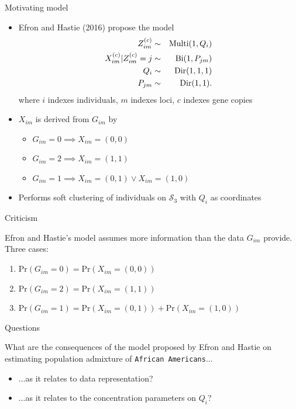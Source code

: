 \documentclass{beamer}
\begin{document}
\begin{frame}{Motivating model}
\begin{itemize}
    \item Efron and Hastie (2016) propose the model
    \begin{eqnarray}
        Z_{im}^{(c)} &\sim& \text{Multi}(1, Q_i)\\
        X_{im}^{(c)} | Z_{im}^{(c)} = j &\sim& \text{Bi}(1, P_{jm}) \notag\\
        Q_i &\sim& \text{Dir}(1, 1, 1) \notag\\
        P_{jm} &\sim& \text{Dir}(1,1). \notag
    \end{eqnarray}
    where $i$ indexes individuals, $m$ indexes loci, $c$ indexes gene copies
    \item $X_{im}$ is derived from $G_{im}$ by
    \begin{itemize}
        \item $G_{im} = 0 \implies X_{im} = (0, 0)$
        \item $G_{im} = 2 \implies X_{im} = (1,1)$
        \item $G_{im} = 1 \implies X_{im} = (0, 1) \lor X_{im} = (1, 0)$
    \end{itemize}
    \item Performs soft clustering of individuals on $\mathcal{S}_3$ with $Q_i$ as coordinates
\end{itemize}
\end{frame}

\begin{frame}{Criticism}

Efron and Hastie's model assumes more information than the data $G_{im}$ provide. Three cases:
\begin{enumerate}
    \item $\text{Pr}(G_{im} = 0) = \text{Pr}(X_{im} = (0, 0))$
    \item $\text{Pr}(G_{im} = 2) = \text{Pr}(X_{im} = (1, 1))$
    \item \color{red}$\text{Pr}(G_{im} = 1) = \text{Pr}(X_{im} = (0, 1)) + \text{Pr}(X_{im} = (1, 0))$
\end{enumerate}
\end{frame}

\begin{frame}{Questions}

What are the consequences of the model proposed by Efron and Hastie on estimating population admixture of \texttt{African Americans}...
\begin{itemize}
    \item ...as it relates to data representation?
    \item ...as it relates to the concentration parameters on $Q_i$?
\end{itemize}

\end{frame}
\end{document}
